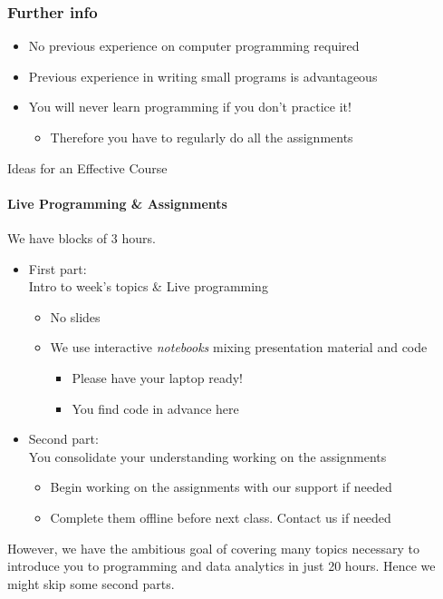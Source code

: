 \documentclass{beamer}%
\begin{document}
\begin{frame}
\frametitle{Further info}
\begin{itemize}
\item No previous experience on computer programming required
\item Previous experience in writing small programs is advantageous
\pause
\item You will never learn  programming if you don't practice it!
\begin{itemize}
\item \color{red}Therefore you have to regularly do all the assignments
\end{itemize}
\end{itemize}
\end{frame}


\begin{frame}{Ideas for an Effective Course} 
\framesubtitle{Live Programming \& Assignments}
We have blocks of 3 hours.
\begin{itemize}
\item First part: %
\\ Intro to week's topics \& Live programming
    \begin{itemize}
    \item No slides
    \item We use interactive \emph{notebooks} mixing presentation material and code %
      \begin{itemize}
      \item Please have your laptop ready! \myurl{\homepagesetup}
	  \item You find code in advance here %
      \end{itemize}
    \end{itemize}


\item Second part: %
\\ You consolidate your understanding working on the assignments
\begin{itemize}
\item Begin working on the assignments with our support if needed
\item Complete them offline before next class. Contact us if needed
\end{itemize}
\end{itemize}
\pause
{\color{red}
However, we have the ambitious goal of covering many topics necessary to introduce you to programming and data analytics in just 20 hours. Hence we might skip some second parts.
}
\end{frame}
\end{document}
